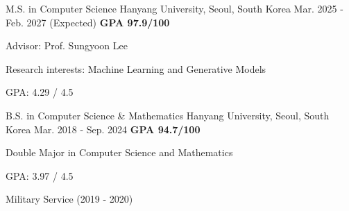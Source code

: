 

\begin{cventries}

  \cventry
    {M.S. in Computer Science} %
    {Hanyang University, Seoul, South Korea}
    {Mar. 2025 - Feb. 2027 (Expected)} %
    {\textbf{GPA 97.9/100}}
    {
      \begin{cvitems} %
        \item {Advisor: Prof. Sungyoon Lee}
        \item {Research interests: Machine Learning and Generative Models}
        \item {GPA: 4.29 / 4.5}
      \end{cvitems}
    }

  \cventry
    {B.S. in Computer Science \& Mathematics} %
    {Hanyang University, Seoul, South Korea} %
    {Mar. 2018 - Sep. 2024} %
    {\textbf{GPA 94.7/100}}
    {
      \begin{cvitems} %
        \item {Double Major in Computer Science and Mathematics}
        \item {GPA: 3.97 / 4.5}
        \item {Military Service (2019 - 2020)}
      \end{cvitems}
    }

\end{cventries}